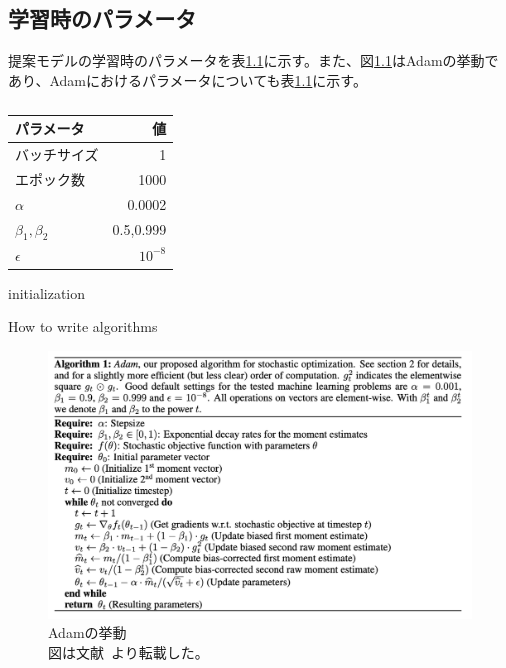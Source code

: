 \appendix
\chapter{}

\section{学習時のパラメータ}
\label{sec:appendix_params}


提案モデルの学習時のパラメータを表\ref{tab:params}に示す。また、図\ref{fig:Adam}はAdamの挙動であり、Adamにおけるパラメータについても表\ref{tab:params}に示す。

\begin{table}[h]
\label{tab:params}
\caption{}
\begin{center}
    \begin{tabular}{lr}\toprule
        パラメータ & 値 \\ \midrule
        バッチサイズ & 1 \\ 
        エポック数 & 1000 \\ 
        $\alpha$ & 0.0002 \\ 
        $\beta_1,\beta_2$ & 0.5,0.999 \\
        $\epsilon$ & $10^{-8}$ \\ \bottomrule
    \end{tabular}
\end{center}
\end{table}

\begin{algorithm}[H]
    \SetAlgoLined
    initialization\;
    \caption{How to write algorithms}
\end{algorithm}

\begin{figure}[b]
\begin{center}
\includegraphics[width=0.9\hsize]{figure/Adam.png}
\caption{Adamの挙動\\
図は文献~\cite{Adam}より転載した。}
\label{fig:Adam}
\end{center}
\end{figure}

